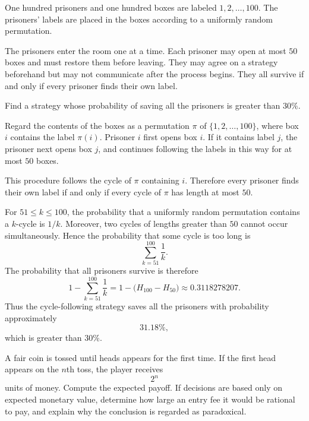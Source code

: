     \begin{expectedproblem}
        One hundred prisoners and one hundred boxes are labeled
        $1,2,\ldots,100$. The prisoners' labels are placed in the boxes
        according to a uniformly random permutation.

        The prisoners enter the room one at a time. Each prisoner may open at
        most $50$ boxes and must restore them before leaving. They may agree on
        a strategy beforehand but may not communicate after the process
        begins. They all survive if and only if every prisoner finds their own
        label.

        Find a strategy whose probability of saving all the prisoners is
        greater than $30\%$.
    \end{expectedproblem}

    \begin{solution}
        Regard the contents of the boxes as a permutation $\pi$ of
        $\{1,2,\ldots,100\}$, where box $i$ contains the label $\pi(i)$.
        Prisoner $i$ first opens box $i$. If it contains label $j$, the
        prisoner next opens box $j$, and continues following the labels in
        this way for at most $50$ boxes.

        This procedure follows the cycle of $\pi$ containing $i$. Therefore
        every prisoner finds their own label if and only if every cycle of
        $\pi$ has length at most $50$.

        For $51\leq k\leq100$, the probability that a uniformly random
        permutation contains a $k$-cycle is $1/k$. Moreover, two cycles of
        lengths greater than $50$ cannot occur simultaneously. Hence the
        probability that some cycle is too long is
        \[
            \sum_{k=51}^{100}\frac{1}{k}.
        \]
        The probability that all prisoners survive is therefore
        \[
            1-\sum_{k=51}^{100}\frac{1}{k}
            =
            1-\bigl(H_{100}-H_{50}\bigr)
            \approx
            0.3118278207.
        \]
        Thus the cycle-following strategy saves all the prisoners with
        probability approximately
        \[
            \boxed{31.18\%},
        \]
        which is greater than $30\%$.
    \end{solution}

    \begin{expectedproblem}
        A fair coin is tossed until heads appears for the first time. If the
        first head appears on the $n$th toss, the player receives
        \[
            2^n
        \]
        units of money. Compute the expected payoff. If decisions are based
        only on expected monetary value, determine how large an entry fee it
        would be rational to pay, and explain why the conclusion is regarded
        as paradoxical.
    \end{expectedproblem}

